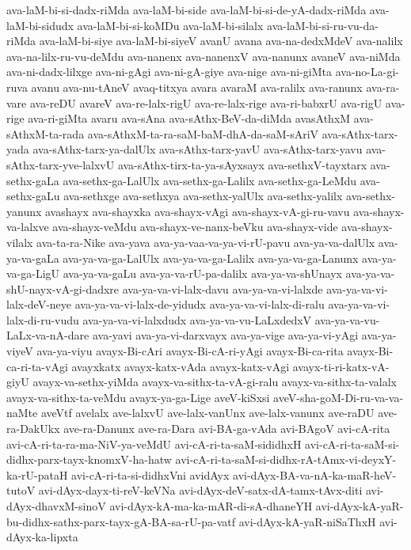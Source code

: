 {ava-laM-bi-si-dadx-riMda
ava-laM-bi-side
ava-laM-bi-si-de-yA-dadx-riMda
ava-laM-bi-sidudx
ava-laM-bi-si-koMDu
ava-laM-bi-silalx
ava-laM-bi-si-ru-vu-da-riMda
ava-laM-bi-siye
ava-laM-bi-siyeV
avanU
avana
ava-na-dedxMdeV
ava-nalilx
ava-na-lilx-ru-vu-deMdu
ava-nanenx
ava-nanenxV
ava-nanunx
avaneV
ava-niMda
ava-ni-dadx-lilxge
ava-ni-gAgi
ava-ni-gA-giye
ava-nige
ava-ni-giMta
ava-no-La-gi-ruva
avanu
ava-nu-tAneV
avaq-titxya
avara
avaraM
ava-ralilx
ava-ranunx
ava-ra-vare
ava-reDU
avareV
ava-re-lalx-rigU
ava-re-lalx-rige
ava-ri-babxrU
ava-rigU
ava-rige
ava-ri-giMta
avaru
ava-sAna
ava-sAthx-BeV-da-diMda
avasAthxM
ava-sAthxM-ta-rada
ava-sAthxM-ta-ra-saM-baM-dhA-da-saM-sAriV
ava-sAthx-tarx-yada
ava-sAthx-tarx-ya-dalUlx
ava-sAthx-tarx-yavU
ava-sAthx-tarx-yavu
ava-sAthx-tarx-yve-lalxvU
ava-sAthx-tirx-ta-ya-sAyxsayx
ava-sethxV-tayxtarx
ava-sethx-gaLa
ava-sethx-ga-LalUlx
ava-sethx-ga-Lalilx
ava-sethx-ga-LeMdu
ava-sethx-gaLu
ava-sethxge
ava-sethxya
ava-sethx-yalUlx
ava-sethx-yalilx
ava-sethx-yanunx
avashayx
ava-shayxka
ava-shayx-vAgi
ava-shayx-vA-gi-ru-vavu
ava-shayx-va-lalxve
ava-shayx-veMdu
ava-shayx-ve-nanx-beVku
ava-shayx-vide
ava-shayx-vilalx
ava-ta-ra-Nike
ava-yava
ava-ya-vaa-va-ya-vi-rU-pavu
ava-ya-va-dalUlx
ava-ya-va-gaLa
ava-ya-va-ga-LalUlx
ava-ya-va-ga-Lalilx
ava-ya-va-ga-Lanunx
ava-ya-va-ga-LigU
ava-ya-va-gaLu
ava-ya-va-rU-pa-dalilx
ava-ya-va-shUnayx
ava-ya-va-shU-nayx-vA-gi-dadxre
ava-ya-va-vi-lalx-davu
ava-ya-va-vi-lalxde
ava-ya-va-vi-lalx-deV-neye
ava-ya-va-vi-lalx-de-yidudx
ava-ya-va-vi-lalx-di-ralu
ava-ya-va-vi-lalx-di-ru-vudu
ava-ya-va-vi-lalxdudx
ava-ya-va-vu-LaLxdedxV
ava-ya-va-vu-LaLx-va-nA-dare
ava-yavi
ava-ya-vi-darxvayx
ava-ya-vige
ava-ya-vi-yAgi
ava-ya-viyeV
ava-ya-viyu
avayx-Bi-cAri
avayx-Bi-cA-ri-yAgi
avayx-Bi-ca-rita
avayx-Bi-ca-ri-ta-vAgi
avayxkatx
avayx-katx-vAda
avayx-katx-vAgi
avayx-ti-ri-katx-vA-giyU
avayx-va-sethx-yiMda
avayx-va-sithx-ta-vA-gi-ralu
avayx-va-sithx-ta-valalx
avayx-va-sithx-ta-veMdu
avayx-ya-ga-Lige
aveV-kiSxsi
aveV-sha-goM-Di-ru-va-va-naMte
aveVtf
avelalx
ave-lalxvU
ave-lalx-vanUnx
ave-lalx-vanunx
ave-raDU
ave-ra-DakUkx
ave-ra-Danunx
ave-ra-Dara
avi-BA-ga-vAda
avi-BAgoV
avi-cA-rita
avi-cA-ri-ta-ra-ma-NiV-ya-veMdU
avi-cA-ri-ta-saM-sididhxH
avi-cA-ri-ta-saM-si-didhx-parx-tayx-knomxV-ha-hatw
avi-cA-ri-ta-saM-si-didhx-rA-tAmx-vi-deyxY-ka-rU-pataH
avi-cA-ri-ta-si-didhxVni
avidAyx
avi-dAyx-BA-va-nA-ka-maR-heV-tutoV
avi-dAyx-dayx-ti-reV-keVNa
avi-dAyx-deV-satx-dA-tamx-tAvx-diti
avi-dAyx-dhavxM-sinoV
avi-dAyx-kA-ma-ka-mAR-di-sA-dhaneYH
avi-dAyx-kA-yaR-bu-didhx-sathx-parx-tayx-gA-BA-sa-rU-pa-vatf
avi-dAyx-kA-yaR-niSaThxH
avi-dAyx-ka-lipxta
}
